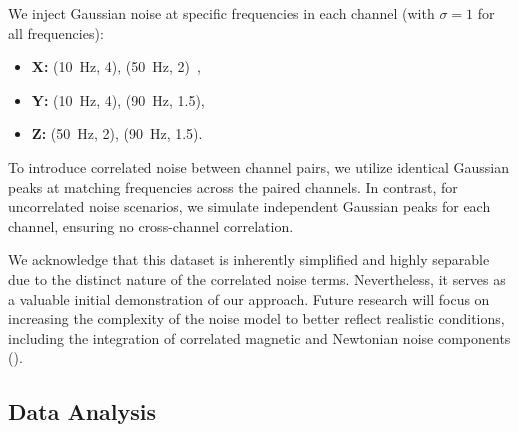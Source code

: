 \documentclass[%
 reprint,
 amsmath,amssymb,
 aps,
 nofootinbib,
]{revtex4-2}
\begin{document}
We inject Gaussian noise at specific frequencies in each channel (with $\sigma=1$ for all frequencies):
\begin{itemize}
    \item[]\textbf{X:} \Sn(\SI{10}{Hz}, 4), \Sn(\SI{50}{Hz}, 2)\ ,
    \item[]\textbf{Y:} \Sn(\SI{10}{Hz}, 4), \Sn(\SI{90}{Hz}, 1.5),
    \item[]\textbf{Z:} \Sn(\SI{50}{Hz}, 2),  \Sn(\SI{90}{Hz}, 1.5).
\end{itemize}
To introduce correlated noise between channel pairs, we utilize identical Gaussian peaks at matching frequencies across the paired channels. 
In contrast, for uncorrelated noise scenarios, we simulate independent Gaussian peaks for each channel, ensuring no cross-channel correlation.

We acknowledge that this dataset is inherently simplified and highly separable due to the distinct nature of the correlated noise terms. 
Nevertheless, it serves as a valuable initial demonstration of our approach. 
Future research will focus on increasing the complexity of the noise model to better reflect realistic conditions, including the integration of correlated magnetic and Newtonian noise components ().

\subsection{Data Analysis}


\end{document}
